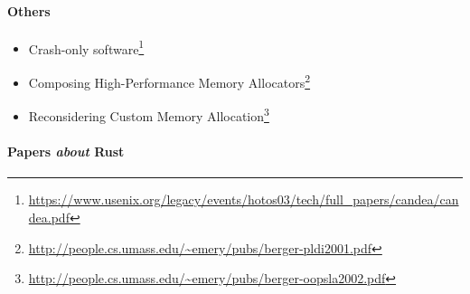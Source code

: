 \documentclass[a4paper,]{book}
\renewcommand{\href}[2]{#2\footnote{\url{#1}}}
\let\oldparagraph\paragraph
\renewcommand{\paragraph}[1]{\oldparagraph{#1}\mbox{}}
\begin{document}
\paragraph{Others}\label{others}

\begin{itemize}
\itemsep1pt\parskip0pt
\item
  \href{https://www.usenix.org/legacy/events/hotos03/tech/full_papers/candea/candea.pdf}{Crash-only
  software}
\item
  \href{http://people.cs.umass.edu/~emery/pubs/berger-pldi2001.pdf}{Composing
  High-Performance Memory Allocators}
\item
  \href{http://people.cs.umass.edu/~emery/pubs/berger-oopsla2002.pdf}{Reconsidering
  Custom Memory Allocation}
\end{itemize}

\paragraph{\texorpdfstring{Papers \emph{about}
Rust}{Papers about Rust}}\label{papers-about-rust}
\end{document}
